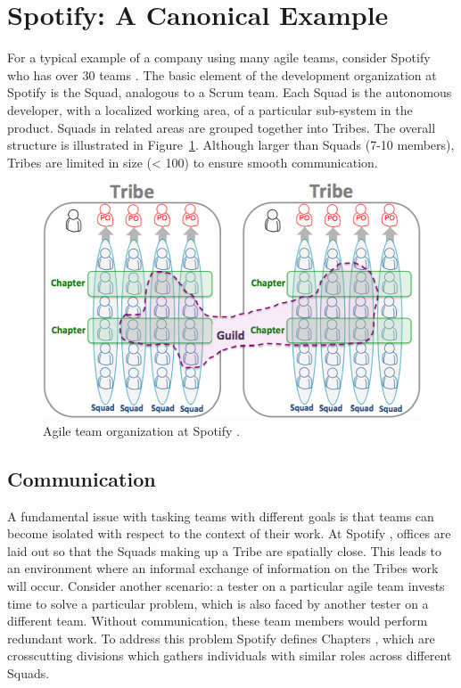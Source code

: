 ﻿\section{Spotify: A Canonical Example} 
For a typical example of a company using many agile teams, consider Spotify who has over 30 teams \cite{kniberg12}.
The basic element of the development organization at Spotify is the Squad, analogous to a Scrum team.
Each Squad is the autonomous developer, with a localized working area, of a particular sub-system in the product.
Squads in related areas are grouped together into Tribes. 
The overall structure is illustrated in Figure~\ref{fig:spotify_structure}.
Although larger than Squads (7-10 members), Tribes are limited in size (< 100) to ensure smooth communication.

\begin{figure}[h]
  \includegraphics[width=\linewidth]{images/kniberg12_structure.png}
  \caption{Agile team organization at Spotify \cite{kniberg12}.}
  \label{fig:spotify_structure}
\end{figure}


\subsection{Communication}
A fundamental issue with tasking teams with different goals is that teams can become isolated with respect to the context of their work.
At Spotify \cite{kniberg12}, offices are laid out so that the Squads making up a Tribe are spatially close. This leads to an environment where an informal exchange of information on the Tribes work will occur.
Consider another scenario: a tester on a particular agile team invests time to solve a particular problem, which is also faced by another tester on a different team. Without communication, these team members would perform redundant work.
To address this problem Spotify defines Chapters \cite{kniberg12}, which are crosscutting divisions which gathers individuals with similar roles across different Squads. 


